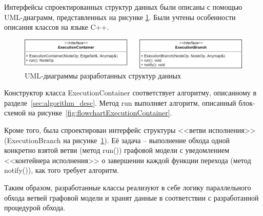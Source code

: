 Интерфейсы спроектированных структур данных были описаны с помощью UML-диаграмм, представленных на рисунке \ref{fig:UMLAll}. Были учтены особенности описания классов на языке C++.

\begin{figure}[!ht]
    \centering
    \includegraphics[width=\textwidth]{figures/UML.all.png}
    \caption{UML-диаграммы разработанных структур данных}
    \label{fig:UMLAll}
\end{figure}

Конструктор класса \textsf{ExecutionContainer} соответствует алгоритму, описанному в разделе~\ref{sec:algorithm_desc}. Метод run выполняет алгоритм, описанный блок-схемой на рисунке~\ref{fig:flowchartExecutionContainer}.

Кроме того, была спроектирован интерфейс структуры <<ветви исполнения>> (\textsf{ExecutionBranch} на рисунке~\ref{fig:UMLAll}). Её задача -- выполнение обхода одной конкретно взятой ветви (метод \textsf{run()}) графовой модели с уведомлением <<контейнера исполнения>> о завершении каждой функции перехода (метод \textsf{notify()}), как того требует алгоритм.

Таким образом, разработанные классы реализуют в себе логику параллельного обхода ветвей графовой модели и хранят данные в соответствии с разработанной процедурой обхода.

